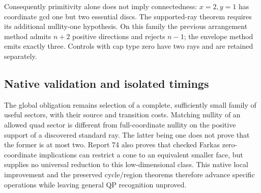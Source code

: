 Consequently primitivity alone does not imply connectedness: $x=2,y=1$
has coordinate gcd one but two essential discs. The supported-ray theorem
requires its additional nullity-one hypothesis. On this family the previous
arrangement method admits $n+2$ positive directions and rejects $n-1$;
the envelope method emits exactly three. Controls with cap type zero have
two rays and are retained separately.

\subsection{Native validation and isolated timings}



The global obligation remains selection of a complete, sufficiently small
family of useful sectors, with their source and transition costs. Matching
nullity of an allowed quad sector is different from full-coordinate nullity
on the positive support of a discovered standard ray. The latter being one
does not prove that the former is at most two. Report 74 also proves that
checked Farkas zero-coordinate implications can restrict a cone to an
equivalent smaller face, but supplies no universal reduction to this
low-dimensional class. This native local improvement and the preserved
cycle/region theorems therefore advance specific operations while leaving
general QP recognition unproved.
